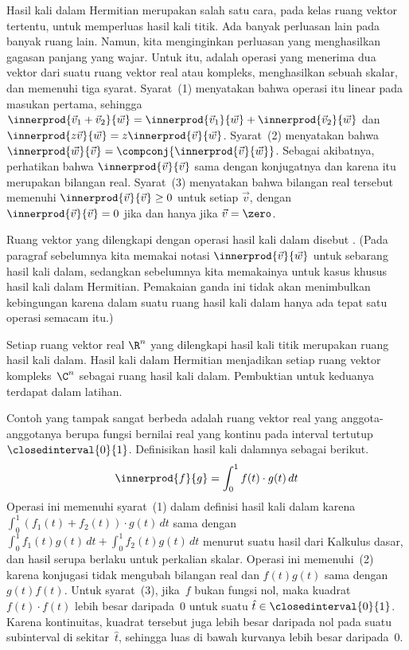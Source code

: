 Hasil kali dalam Hermitian merupakan salah satu cara, pada kelas ruang
vektor tertentu, untuk memperluas hasil kali titik.
Ada banyak perluasan lain pada banyak ruang lain.
Namun, kita menginginkan perluasan yang menghasilkan gagasan panjang yang wajar.
Untuk itu,  adalah operasi
yang menerima dua vektor dari suatu ruang vektor real atau kompleks,
menghasilkan sebuah skalar, dan memenuhi tiga syarat.
Syarat~(1) menyatakan bahwa operasi itu linear pada masukan pertama, sehingga
$\innerprod{\vec{v}_1+\vec{v}_2}{\vec{w}}
 = \innerprod{\vec{v}_1}{\vec{w}}
   +\innerprod{\vec{v}_2}{\vec{w}}$
dan $\innerprod{z\vec{v}}{\vec{w}}
     =z\innerprod{\vec{v}}{\vec{w}}$.
Syarat~(2) menyatakan bahwa
$\innerprod{\vec{w}}{\vec{v}}=\compconj{\innerprod{\vec{v}}{\vec{w}}}$.
Sebagai akibatnya, perhatikan bahwa
$\innerprod{\vec{v}}{\vec{v}}$ sama dengan konjugatnya dan karena itu
merupakan bilangan real.
Syarat~(3) menyatakan bahwa bilangan real tersebut memenuhi
$\innerprod{\vec{v}}{\vec{v}}\geq 0$ untuk setiap $\vec{v}$, dengan
$\innerprod{\vec{v}}{\vec{v}}= 0$ jika dan hanya jika $\vec{v}=\zero$.

Ruang vektor yang dilengkapi dengan operasi hasil kali dalam disebut
.
(Pada paragraf sebelumnya kita memakai notasi $\innerprod{\vec{v}}{\vec{w}}$
untuk sebarang hasil kali dalam, sedangkan sebelumnya kita memakainya untuk
kasus khusus hasil kali dalam Hermitian.
Pemakaian ganda ini tidak akan menimbulkan kebingungan karena dalam suatu ruang
hasil kali dalam hanya ada tepat satu operasi semacam itu.)

Setiap ruang vektor real $\R^n$ yang dilengkapi hasil kali titik merupakan
ruang hasil kali dalam.
Hasil kali dalam Hermitian menjadikan setiap ruang vektor kompleks~$\C^n$
sebagai ruang hasil kali dalam.
Pembuktian untuk keduanya terdapat dalam latihan.

Contoh yang tampak sangat berbeda adalah ruang vektor real yang
anggota-anggotanya berupa fungsi bernilai real yang kontinu pada
interval tertutup $\closedinterval{0}{1}$.
Definisikan hasil kali dalamnya sebagai berikut.
\begin{equation*}
  \innerprod{f}{g}=\int_{0}^1 f(t)\cdot g(t)\,dt
\end{equation*}
Operasi ini memenuhi syarat~(1) dalam definisi hasil kali dalam karena
$\int_{0}^1 (f_1(t)+f_2(t))\cdot g(t)\,dt$ sama dengan
$\int_{0}^1 f_1(t)g(t)\,dt+\int_{0}^1 f_2(t)g(t)\,dt$
menurut suatu hasil dari Kalkulus dasar, dan hasil serupa berlaku untuk
perkalian skalar.
Operasi ini memenuhi~(2) karena konjugasi tidak mengubah bilangan real dan
$f(t)g(t)$ sama dengan $g(t)f(t)$.
Untuk syarat~(3), jika~$f$ bukan fungsi nol, maka kuadrat
$f(t)\cdot f(t)$ lebih besar daripada~$0$ untuk suatu
$\hat{t}\in \closedinterval{0}{1}$.
Karena kontinuitas, kuadrat tersebut juga lebih besar daripada nol pada suatu
subinterval di sekitar~$\hat{t}$, sehingga luas di bawah kurvanya lebih besar
daripada~$0$.

